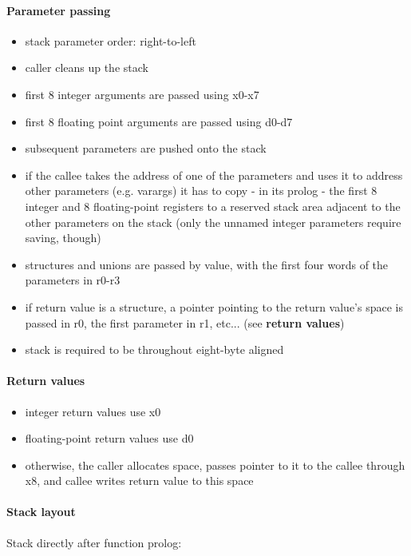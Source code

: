 \paragraph{Parameter passing}

\begin{itemize}
\item stack parameter order: right-to-left
\item caller cleans up the stack
\item first 8 integer arguments are passed using x0-x7
\item first 8 floating point arguments are passed using d0-d7
\item subsequent parameters are pushed onto the stack
\item if the callee takes the address of one of the parameters and uses it to address other parameters (e.g. varargs) it has to copy - in its prolog - the first 8 integer and 8 floating-point registers to a reserved stack area adjacent to the other parameters on the stack (only the unnamed integer parameters require saving, though)
\item structures and unions are passed by value, with the first four words of the parameters in r0-r3
\item if return value is a structure, a pointer pointing to the return value's space is passed in r0, the first parameter in r1, etc... (see {\bf return values})
\item stack is required to be throughout eight-byte aligned
\end{itemize}

\paragraph{Return values}
\begin{itemize}
\item integer return values use x0
\item floating-point return values use d0
\item otherwise, the caller allocates space, passes pointer to it to the callee through x8, and callee writes return value to this space
\end{itemize}

\paragraph{Stack layout}

Stack directly after function prolog:\\

